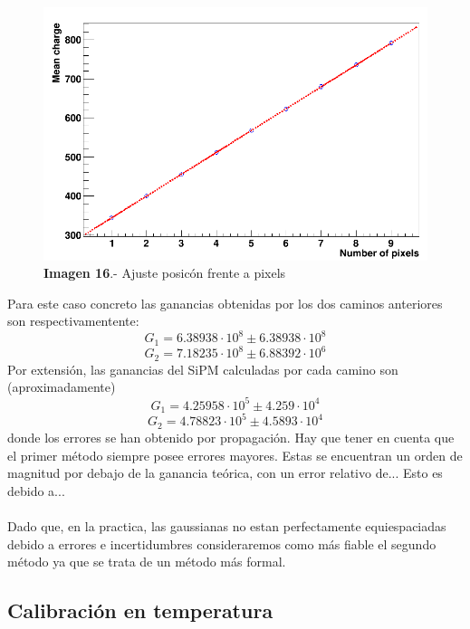 \documentclass[11pt, a4paper]{article}
\begin{document}
\begin{itemize}
\begin{itemize}
	\begin{figure}[hbtp]
		\centering
		\includegraphics[scale=0.2]{FitPosicionPixels.png}
		\caption{\textbf{Imagen 16}.- Ajuste posicón frente a pixels}
		\end{figure}
			
	
	\end{itemize}
	
Para este caso concreto las ganancias obtenidas por los dos caminos anteriores son respectivamentente:
$$G_1= 6.38938 \cdot 10^8 \pm  6.38938 \cdot 10^8 $$  
$$G_2=7.18235 \cdot 10^8 \pm 6.88392 \cdot 10^6$$
Por extensión, las ganancias del SiPM calculadas por cada camino son (aproximadamente) 
$$G_1= 4.25958 \cdot 10^5 \pm 4.259 \cdot 10^4$$  
$$G_2= 4.78823 \cdot 10^5 \pm 4.5893 \cdot 10^4$$
donde los errores se han obtenido por propagación. Hay que tener en cuenta que el primer método siempre posee errores mayores. Estas se encuentran un orden de magnitud por debajo de la ganancia teórica, con un error relativo de... Esto es debido a...

\paragraph {}
Dado que, en la practica, las gaussianas no estan perfectamente equiespaciadas debido a errores e incertidumbres consideraremos como más fiable el segundo método ya que se trata de un método más formal. 


\end{itemize}

\subsection {Calibración en temperatura}
\end{document}
